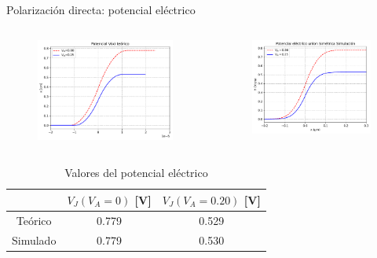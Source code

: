 \documentclass[aspectratio=169,xcolor=dvipsnames]{beamer}
\begin{document}
\begin{frame}{Polarización directa: potencial eléctrico}
    \begin{columns}
        \begin{column}{0.5\textwidth}
            \begin{figure}
                \includegraphics[width=0.90\linewidth]{Teorico/Potencial_Electrico-Directa.pdf}
            \end{figure}
        \end{column}
        \begin{column}{0.5\textwidth}
            \begin{figure}
                \includegraphics[width=0.90\linewidth]{Directa/Potencial_Electrico-Directa.pdf}
            \end{figure}
        \end{column}
        \end{columns}
        \begin{table}
            \caption{Valores del potencial eléctrico}
            \begin{tabular}{c|cc}
                & $V_J (V_A=0)$ [V] & $V_J (V_A=0.20)$ [V]  \\ \hline
                Teórico & 0.779  & 0.529 \\
                Simulado & 0.779  & 0.530 
            \end{tabular}
        \end{table}
\end{frame}
\end{document}
